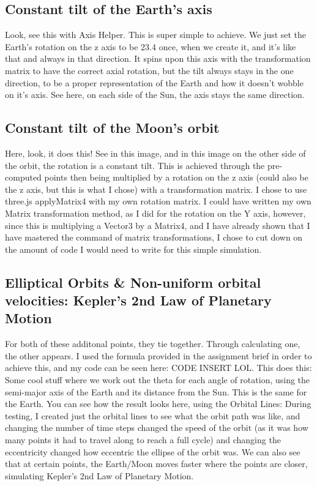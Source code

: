 \documentclass[12pt]{article}
\begin{document}
\subsection{Constant tilt of the Earth's axis}
Look, see this with Axis Helper. This is super simple to achieve. We just set the Earth's rotation on the z axis to be 23.4 once, when we create it, and it's like that and always in that direction. It spins upon this axis with the transformation matrix to have the correct axial rotation, but the tilt always stays in the one direction, to be a proper representation of the Earth and how it doesn't wobble on it's axis. See here, on each side of the Sun, the axis stays the same direction.

\subsection{Constant tilt of the Moon's orbit}
Here, look, it does this! See in this image, and in this image on the other side of the orbit, the rotation is a constant tilt. This is achieved through the pre-computed points then being multiplied by a rotation on the z axis (could also be the z axis, but this is what I chose) with a transformation matrix. I chose to use three.js applyMatrix4 with my own rotation matrix. I could have written my own Matrix transformation method, as I did for the rotation on the Y axis, however, since this is multiplying a Vector3 by a Matrix4, and I have already shown that I have mastered the command of matrix transformations, I chose to cut down on the amount of code I would need to write for this simple simulation.

\subsection{Elliptical Orbits \& Non-uniform orbital velocities: Kepler's 2nd Law of Planetary Motion}
For both of these additonal points, they tie together. Through calculating one, the other appears. I used the formula provided in the assignment brief \cite{assignment} in order to achieve this, and my code can be seen here: CODE INSERT LOL. This does this: Some cool stuff where we work out the theta for each angle of rotation, using the semi-major axis of the Earth and its distance from the Sun. This is the same for the Earth. You can see how the result looks here, using the Orbital Lines: During testing, I created just the orbital lines to see what the orbit path was like, and changing the number of time steps changed the speed of the orbit (as it was how many points it had to travel along to reach a full cycle) and changing the eccentricity changed how eccentric the ellipse of the orbit was. We can also see that at certain points, the Earth/Moon moves faster where the points are closer, simulating Kepler's 2nd Law of Planetary Motion.
\end{document}
